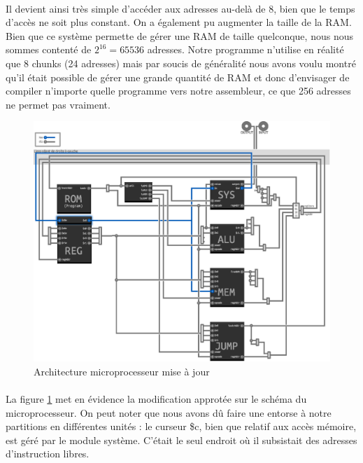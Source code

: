 \documentclass{article}
\begin{document}
\paragraph{}Il devient ainsi très simple d'accéder aux adresses au-delà de 8, bien que le temps d'accès ne soit plus constant. On a également pu augmenter la taille de la RAM. Bien que ce système permette de gérer une RAM de taille quelconque, nous nous sommes contenté de $2^{16} = 65536$ adresses. Notre programme n'utilise en réalité que 8 chunks (24 adresses) mais par soucis de généralité nous avons voulu montré qu'il était possible de gérer une grande quantité de RAM et donc d'envisager de compiler n'importe quelle programme vers notre assembleur, ce que 256 adresses ne permet pas vraiment.

\begin{figure}[h]
\centering
\includegraphics{archi_update.eps}
\caption{\label{archi_update} Architecture microprocesseur mise à jour}
\end{figure}
\paragraph{}La figure \ref{archi_update} met en évidence la modification approtée sur le schéma du microprocesseur. On peut noter que nous avons dû faire une entorse à notre partitions en différentes unités : le curseur \$c, bien que relatif aux accès mémoire, est géré par le module système. C'était le seul endroit où il subsistait des adresses d'instruction libres.
\end{document}
